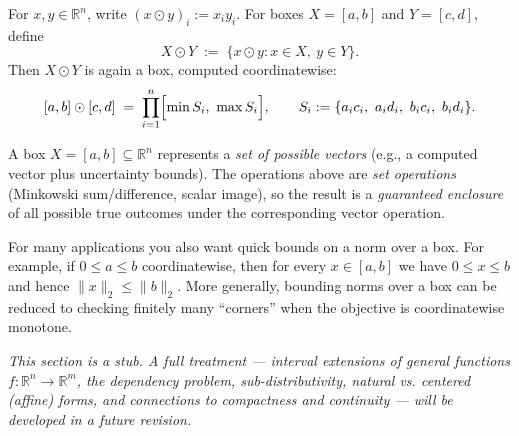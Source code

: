 \begin{tcolorbox}[colback=propbox, colframe=propborder, arc=2pt,
  left=6pt, right=6pt, top=4pt, bottom=4pt,
  title={\small\textbf{Definition (Coordinatewise / Hadamard Product of Boxes)}},
  fonttitle=\small\bfseries]
\label{def:box-hadamard}
For $x,y\in\mathbb{R}^n$, write $(x\odot y)_i := x_i y_i$.
For boxes $X=[a,b]$ and $Y=[c,d]$, define
\[
X\odot Y \;:=\; \{x\odot y : x\in X,\ y\in Y\}.
\]
Then $X\odot Y$ is again a box, computed coordinatewise:
\[
[a,b]\odot[c,d] \;=\; \prod_{i=1}^n \Bigl[\min S_i,\ \max S_i\Bigr],
\qquad
S_i:=\{a_ic_i,\ a_id_i,\ b_ic_i,\ b_id_i\}.
\]
\end{tcolorbox}

\begin{remark}
A box $X=[a,b]\subseteq\mathbb{R}^n$ represents a \emph{set of possible vectors}
(e.g., a computed vector plus uncertainty bounds). The operations above are
\emph{set operations} (Minkowski sum/difference, scalar image), so the result is a
\emph{guaranteed enclosure} of all possible true outcomes under the corresponding
vector operation.
\end{remark}

\begin{remark}
For many applications you also want quick bounds on a norm over a box.
For example, if $0\le a\le b$ coordinatewise, then for every $x\in[a,b]$ we have
$0\le x\le b$ and hence $\|x\|_2\le \|b\|_2$. More generally, bounding norms over
a box can be reduced to checking finitely many ``corners'' when the objective is
coordinatewise monotone.
\label{rem:norm-bounds}
\end{remark}

\begin{remark}[Status]
\textit{This section is a stub. A full treatment — interval extensions of general
functions $f:\mathbb{R}^n\to\mathbb{R}^m$, the dependency problem, sub-distributivity,
natural vs. centered (affine) forms, and connections to compactness and continuity —
will be developed in a future revision.}
\end{remark}
